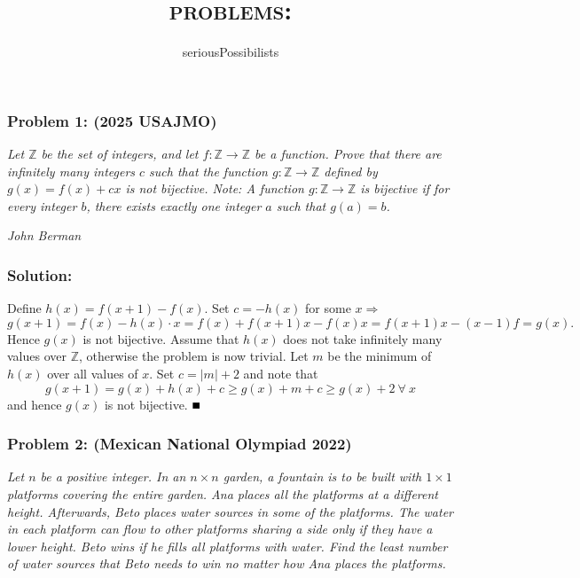 \documentclass[fontsize=10pt]{article}
\begin{document}
\title{\textsc{problems:}}
\author{seriousPossibilists}
\date{}
\maketitle


\subsubsection*{Problem 1: (2025 USAJMO)}
    \textit{Let $\mathbb Z$ be the set of integers, and let $f\colon \mathbb Z \to \mathbb Z$ be a function. 
    Prove that there are infinitely many integers $c$ such that the function $g\colon \mathbb Z \to \mathbb Z$ 
    defined by $g(x) = f(x) + cx$ is not bijective. \newline
    \emph{Note: A function $g\colon \mathbb Z \to \mathbb Z$ is bijective if for every integer $b$, 
    there exists exactly one integer $a$ such that $g(a) = b$.} }
    \begin{flushright}
        \emph{John Berman}
    \end{flushright}
    \subsubsection*{Solution:}
    Define $h(x) = f(x+1)-f(x)$. Set $c=-h(x)$ for some 
    $x \Rightarrow$ \[g(x+1) = f(x) -h(x) \cdot x = f(x) +f(x+1)x - f(x)x = f(x+1)x-(x-1)f = g(x).\]
    Hence $g(x)$ is not bijective. Assume that $h(x)$ does 
    not take infinitely many values over $\mathbb{Z}$,
    otherwise the problem is now trivial. 
    Let $m$ be the minimum of $h(x)$ over all values of $x$. 
    Set $c = |m| + 2$ and note that \[g(x+1) = g(x) + h(x)+c \ge g(x) + m+c \ge g(x)+2 \ \forall \ x\]
    and hence $g(x)$ is not bijective. $\hfill \blacksquare$
\subsubsection*{Problem 2: (Mexican National Olympiad 2022)}
\textit{
Let $n$ be a positive integer. In an $n\times n$ garden, a fountain is to be built with $1\times 1$ platforms covering the entire garden. Ana places all the platforms at a different height. Afterwards, Beto places water sources in some of the platforms. The water in each platform can flow to other platforms sharing a side only if they have a lower height. Beto wins if he fills all platforms with water.
Find the least number of water sources that Beto needs to win no matter how Ana places the platforms. }
\end{document}

